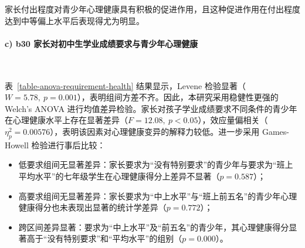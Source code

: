 \documentclass[zihao = -4, linespread = 1.5]{article}
\begin{document}
家长付出程度对青少年心理健康具有积极的促进作用，且这种促进作用在付出程度达到中等偏上水平后表现得尤为明显。

\paragraph*{c) b30 家长对初中生学业成绩要求与青少年心理健康}~{}

表~\ref{table-anova-requirement-health} 结果显示，Levene 检验显著（$W=5.78,\ p=0.001$），表明组间方差不齐。因此，本研究采用稳健性更强的 Welch's ANOVA 进行均值差异检验。家长对孩子学业成绩要求不同条件的青少年在心理健康水平上存在显著差异（$F=12.08,\ p<0.05$），效应量偏相关（$\eta^2_p = 0.00576$），表明该因素对心理健康变异的解释力较低。进一步采用 Games-Howell 检验进行事后比较：

\begin{itemize}
    \item 低要求组间无显著差异：家长要求为“没有特别要求”的青少年与要求为“班上平均水平”的七年级学生在心理健康得分上差异不显著（$p=0.587$）；
    \item 高要求组间无显著差异：家长要求为“中上水平”与“班上前五名”的青少年心理健康得分也未表现出显著的统计学差异（$p=0.772$）；
    \item 跨区间差异显著：要求为“中上水平”及“前五名”的青少年，其心理健康得分显著高于“没有特别要求”和“平均水平”的组别（$p=0.000$）。
\end{itemize}
\end{document}
